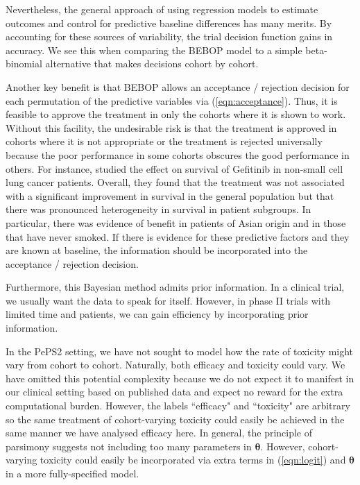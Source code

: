 \documentclass[alpha-refs]{wiley-article}
\begin{document}
Nevertheless, the general approach of using regression models to estimate outcomes and control for predictive baseline differences has many merits.
By accounting for these sources of variability, the trial decision function gains in accuracy.
We see this when comparing the BEBOP model to a simple beta-binomial alternative that makes decisions cohort by cohort.

Another key benefit is that BEBOP allows an acceptance / rejection decision for each permutation of the predictive variables via (\ref{eqn:acceptance}).
Thus, it is feasible to approve the treatment in only the cohorts where it is shown to work. 
Without this facility, the undesirable risk is that the treatment is approved in cohorts where it is not appropriate or the treatment is rejected universally because the poor performance in some cohorts obscures the good performance in others.
For instance, \cite{Thatcher2005} studied the effect on survival of Gefitinib in non-small cell lung cancer patients.
Overall, they found that the treatment was not associated with a significant improvement in survival in the general population but that there was pronounced heterogeneity in survival in patient subgroups.
In particular, there was evidence of benefit in patients of Asian origin and in those that have never smoked.
If there is evidence for these predictive factors and they are known at baseline, the information should be incorporated into the acceptance / rejection decision.

Furthermore, this Bayesian method admits prior information.
In a clinical trial, we usually want the data to speak for itself.
However, in phase II trials with limited time and patients, we can gain efficiency by incorporating prior information.

In the PePS2 setting, we have not sought to model how the rate of toxicity might vary from cohort to cohort.
Naturally, both efficacy and toxicity could vary.
We have omitted this potential complexity because we do not expect it to manifest in our clinical setting based on published data \citep{Garon2015, Herbst2016} and expect no reward for the extra computational burden. 
However, the labels ``efficacy" and ``toxicity" are arbitrary so the same treatment of cohort-varying toxicity could easily be achieved in the same manner we have analysed efficacy here.
In general, the principle of parsimony suggests not including too many parameters in $\boldsymbol{\theta}$.
However, cohort-varying toxicity could easily be incorporated via extra terms in (\ref{eqn:logit}) and $\boldsymbol{\theta}$ in a more fully-specified model.
\end{document}
